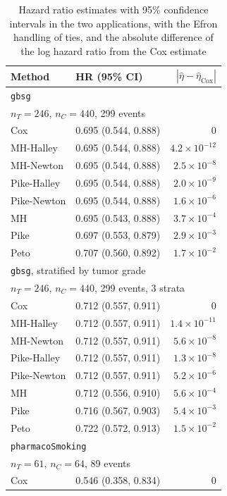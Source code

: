 \begin{table}
\caption{Hazard ratio estimates with 95\% confidence intervals in the two applications, with the Efron handling of ties, and the absolute difference of the log hazard ratio from the Cox estimate}
\label{tab:application}
\centering
\small
\begin{tabular}{llr}
\toprule
Method & HR (95\% CI) & $|\hat{\eta} - \hat{\eta}_{\mathrm{Cox}}|$ \\
\midrule
\multicolumn{3}{l}{\texttt{gbsg}} \\
\multicolumn{3}{l}{$n_T = 246$, $n_C = 440$, 299 events} \\
Cox & 0.695 (0.544, 0.888) & $0$ \\
MH-Halley & 0.695 (0.544, 0.888) & $4.2 \times 10^{-12}$ \\
MH-Newton & 0.695 (0.544, 0.888) & $2.5 \times 10^{-8}$ \\
Pike-Halley & 0.695 (0.544, 0.888) & $2.0 \times 10^{-9}$ \\
Pike-Newton & 0.695 (0.544, 0.888) & $1.6 \times 10^{-6}$ \\
MH & 0.695 (0.543, 0.888) & $3.7 \times 10^{-4}$ \\
Pike & 0.697 (0.553, 0.879) & $2.9 \times 10^{-3}$ \\
Peto & 0.707 (0.560, 0.892) & $1.7 \times 10^{-2}$ \\
\midrule
\multicolumn{3}{l}{\texttt{gbsg}, stratified by tumor grade} \\
\multicolumn{3}{l}{$n_T = 246$, $n_C = 440$, 299 events, 3 strata} \\
Cox & 0.712 (0.557, 0.911) & $0$ \\
MH-Halley & 0.712 (0.557, 0.911) & $1.4 \times 10^{-11}$ \\
MH-Newton & 0.712 (0.557, 0.911) & $5.6 \times 10^{-8}$ \\
Pike-Halley & 0.712 (0.557, 0.911) & $1.3 \times 10^{-8}$ \\
Pike-Newton & 0.712 (0.557, 0.911) & $5.2 \times 10^{-6}$ \\
MH & 0.712 (0.556, 0.910) & $5.6 \times 10^{-4}$ \\
Pike & 0.716 (0.567, 0.903) & $5.4 \times 10^{-3}$ \\
Peto & 0.722 (0.572, 0.913) & $1.5 \times 10^{-2}$ \\
\midrule
\multicolumn{3}{l}{\texttt{pharmacoSmoking}} \\
\multicolumn{3}{l}{$n_T = 61$, $n_C = 64$, 89 events} \\
Cox & 0.546 (0.358, 0.834) & $0$ \\

\end{tabular}
\end{table}
